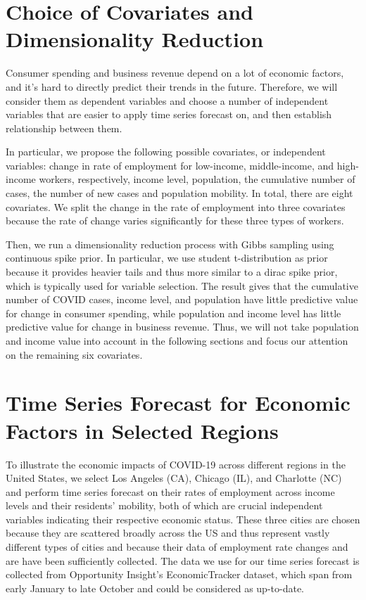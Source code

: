 \documentclass{article}
\begin{document}
\section{Choice of Covariates and Dimensionality Reduction}
Consumer spending and business revenue depend on a lot of economic factors, and it's hard to directly predict their trends in the future. Therefore, we will consider them as dependent variables and choose a number of independent variables that are easier to apply time series forecast on, and then establish relationship between them.
\par
In particular, we propose the following possible covariates, or independent variables: change in rate of employment for low-income, middle-income, and high-income workers, respectively, income level, population, the cumulative number of cases, the number of new cases and population mobility. In total, there are eight covariates. We split the change in the rate of employment into three covariates because the rate of change varies significantly for these three types of workers. 
\par
Then, we run a dimensionality reduction process with Gibbs sampling using continuous spike prior. In particular, we use student t-distribution as prior because it provides heavier tails and thus more similar to a dirac spike prior, which is typically used for variable selection. The result gives that the cumulative number of COVID cases, income level, and population have little predictive value for change in consumer spending, while population and income level has little predictive value for change in business revenue. Thus, we will not take population and income value into account in the following sections and focus our attention on the remaining six covariates. 


\section{Time Series Forecast for Economic Factors in Selected Regions}
\par
To illustrate the economic impacts of COVID-19 across different regions in the United States, we select Los Angeles (CA), Chicago (IL), and Charlotte (NC) and perform time series forecast on their rates of employment across income levels and their residents' mobility, both of which are crucial independent variables indicating their respective economic status. These three cities are chosen because they are scattered broadly across the US and thus represent vastly different types of cities and because their data of employment rate changes and are have been sufficiently collected. The data we use for our time series forecast is collected from Opportunity Insight's EconomicTracker dataset, which span from early January to late October and could be considered as up-to-date.  
\end{document}
